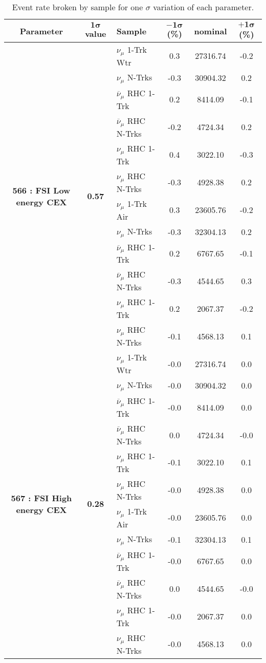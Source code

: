 \addtocounter{table}{-1}
\begin{table}[ht!]
\centering
\begin{tabular}{ c  c  l  c  c  c }
\midrule[1.3pt]
\textbf{Parameter} & \textbf{$\mathbf{1\sigma}$ value} & \textbf{Sample} & \textbf{$\mathbf{-1\sigma}$ (\%)}  &  \textbf{nominal}  &  \textbf{$\mathbf{+1\sigma}$ (\%)} \\
\midrule[1.3pt]
\multirow{12}{*}{\textbf{566 : FSI Low energy CEX}} & \multirow{12}{*}{\textbf{0.57}} & $\nu_\mu$ 1-Trk Wtr &   0.3 &  27316.74 &   -0.2 \\ 
 &  & $\nu_\mu$ N-Trks &   -0.3 &  30904.32 &   0.2 \\ 
 &  & $\overline{\nu}_\mu$ RHC 1-Trk &   0.2 &  8414.09 &   -0.1 \\ 
 &  & $\overline{\nu}_\mu$ RHC N-Trks &   -0.2 &  4724.34 &   0.2 \\ 
 &  & $\nu_\mu$ RHC 1-Trk &   0.4 &  3022.10 &   -0.3 \\ 
 &  & $\nu_\mu$ RHC N-Trks &   -0.3 &  4928.38 &   0.2 \\ 
 &  & $\nu_\mu$ 1-Trk Air &   0.3 &  23605.76 &   -0.2 \\ 
 &  & $\nu_\mu$ N-Trks &   -0.3 &  32304.13 &   0.2 \\ 
 &  & $\overline{\nu}_\mu$ RHC 1-Trk &   0.2 &  6767.65 &   -0.1 \\ 
 &  & $\overline{\nu}_\mu$ RHC N-Trks &   -0.3 &  4544.65 &   0.3 \\ 
 &  & $\nu_\mu$ RHC 1-Trk &   0.2 &  2067.37 &   -0.2 \\ 
 &  & $\nu_\mu$ RHC N-Trks &   -0.1 &  4568.13 &   0.1 \\ 
\midrule[1.3pt]
\multirow{12}{*}{\textbf{567 : FSI High energy CEX}} & \multirow{12}{*}{\textbf{0.28}} & $\nu_\mu$ 1-Trk Wtr &   -0.0 &  27316.74 &   0.0 \\ 
 &  & $\nu_\mu$ N-Trks &   -0.0 &  30904.32 &   0.0 \\ 
 &  & $\overline{\nu}_\mu$ RHC 1-Trk &   -0.0 &  8414.09 &   0.0 \\ 
 &  & $\overline{\nu}_\mu$ RHC N-Trks &   0.0 &  4724.34 &   -0.0 \\ 
 &  & $\nu_\mu$ RHC 1-Trk &   -0.1 &  3022.10 &   0.1 \\ 
 &  & $\nu_\mu$ RHC N-Trks &   -0.0 &  4928.38 &   0.0 \\ 
 &  & $\nu_\mu$ 1-Trk Air &   -0.0 &  23605.76 &   0.0 \\ 
 &  & $\nu_\mu$ N-Trks &   -0.1 &  32304.13 &   0.1 \\ 
 &  & $\overline{\nu}_\mu$ RHC 1-Trk &   -0.0 &  6767.65 &   0.0 \\ 
 &  & $\overline{\nu}_\mu$ RHC N-Trks &   0.0 &  4544.65 &   -0.0 \\ 
 &  & $\nu_\mu$ RHC 1-Trk &   -0.0 &  2067.37 &   0.0 \\ 
 &  & $\nu_\mu$ RHC N-Trks &   -0.0 &  4568.13 &   0.0 \\ 
\midrule[1.3pt]
\end{tabular}
\centering
\caption{Event rate broken by sample for one $\sigma$ variation of each parameter.}
\end{table}
